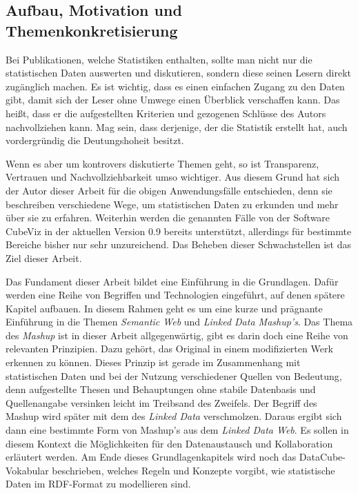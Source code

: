 \documentclass[11pt]{article}
\begin{document}
%
% 
\subsection{Aufbau, Motivation und Themenkonkretisierung}

Bei Publikationen, welche Statistiken enthalten, sollte man nicht nur die statistischen Daten auswerten und diskutieren, sondern diese seinen Lesern direkt zugänglich machen. Es ist wichtig, dass es einen einfachen Zugang zu den Daten gibt, damit sich der Leser ohne Umwege einen Überblick verschaffen kann. Das heißt, dass er die aufgestellten Kriterien und gezogenen Schlüsse des Autors nachvollziehen kann. Mag sein, dass derjenige, der die Statistik erstellt hat, auch vordergründig die Deutungshoheit besitzt. 

\newpage
\noindent
Wenn es aber um kontrovers diskutierte Themen geht, so ist Transparenz, Vertrauen und Nachvollziehbarkeit umso wichtiger. Aus diesem Grund hat sich der Autor dieser Arbeit für die obigen Anwendungsfälle entschieden, denn sie beschreiben verschiedene Wege, um statistischen Daten zu erkunden und mehr über sie zu erfahren. Weiterhin werden die genannten Fälle von der Software CubeViz in der aktuellen Version 0.9 bereits unterstützt, allerdings für bestimmte Bereiche bisher nur sehr unzureichend. Das Beheben dieser Schwachstellen ist das Ziel dieser Arbeit. 

Das Fundament dieser Arbeit bildet eine Einführung in die Grundlagen. Dafür werden eine Reihe von Begriffen und Technologien eingeführt, auf denen spätere Kapitel aufbauen. In diesem Rahmen geht es um eine kurze und prägnante Einführung in die Themen \textit{Semantic Web} und \textit{Linked Data Mashup's}. Das Thema des \textit{Mashup} ist in dieser Arbeit allgegenwärtig, gibt es darin doch eine Reihe von relevanten Prinzipien. Dazu gehört, das Original in einem modifizierten Werk erkennen zu können. Dieses Prinzip ist gerade im Zusammenhang mit statistischen Daten und bei der Nutzung verschiedener Quellen von Bedeutung, denn aufgestellte Thesen und Behauptungen ohne stabile Datenbasis und Quellenangabe versinken leicht im Treibsand des Zweifels. Der Begriff des Mashup wird später mit dem des \textit{Linked Data} verschmolzen. Daraus ergibt sich dann eine bestimmte Form von Mashup's aus dem \textit{Linked Data Web}. Es sollen in diesem Kontext die Möglichkeiten für den Datenaustausch und Kollaboration erläutert werden. Am Ende dieses Grundlagenkapitels wird noch das DataCube-Vokabular beschrieben, welches Regeln und Konzepte vorgibt, wie statistische Daten im RDF-Format zu modellieren sind.
\end{document}
